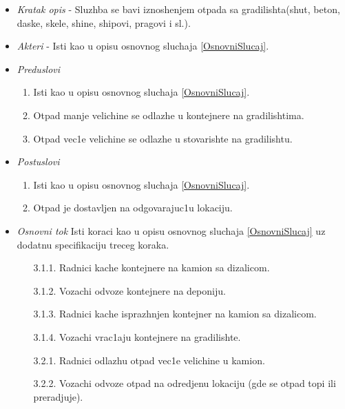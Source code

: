 \documentclass[10 pt]{article}
\begin{document}
		\begin{itemize}
			
			\item\textit{Kratak opis} - Sluzhba se bavi iznoshenjem otpada sa gradilishta(shut, beton, daske, skele, shine, shipovi, pragovi i sl.).
			
			\item\textit{Akteri} - Isti kao u opisu osnovnog sluchaja \ref{OsnovniSlucaj}.
			
			\item\textit{Preduslovi} 
				\begin{enumerate}
					\item Isti kao u opisu osnovnog sluchaja \ref{OsnovniSlucaj}.
					\item Otpad manje velichine se odlazhe u kontejnere na gradilishtima.
					\item Otpad vec1e velichine se odlazhe u stovarishte na gradilishtu.
				\end{enumerate} 
			
			\item\textit{Postuslovi}
			\begin{enumerate}
				\item Isti kao u opisu osnovnog sluchaja \ref{OsnovniSlucaj}.
				\item Otpad je dostavljen na odgovarajuc1u lokaciju.
			\end{enumerate}
			
			\item\textit{Osnovni tok}
			Isti koraci kao u opisu osnovnog sluchaja \ref{OsnovniSlucaj}
			uz dodatnu specifikaciju treceg koraka.
			\begin{enumerate}
				\item [3.1.1.] Radnici kache kontejnere na kamion sa dizalicom.
				\item [3.1.2.] Vozachi odvoze kontejnere na deponiju.
				\item [3.1.3.] Radnici kache isprazhnjen kontejner na kamion sa dizalicom.
				\item [3.1.4.] Vozachi vrac1aju kontejnere na gradilishte.
				
				\item [3.2.1.] Radnici odlazhu otpad vec1e velichine u kamion.
				\item [3.2.2.] Vozachi odvoze otpad na odredjenu lokaciju (gde se otpad topi ili preradjuje).
			\end{enumerate}
		
		\end{itemize}
	
\end{document}
